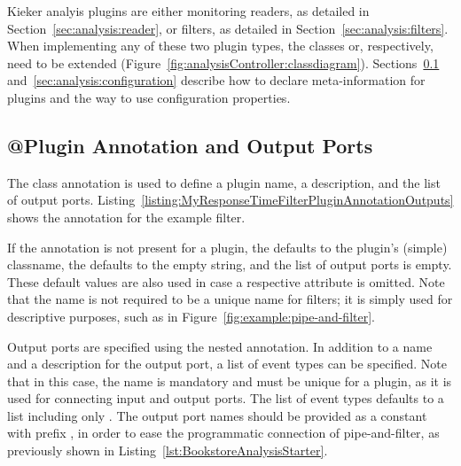 Kieker analyis plugins are either monitoring readers, as detailed in Section~\ref{sec:analysis:reader}, %
or filters, as detailed in Section~\ref{sec:analysis:filters}. When implementing %
any of these two plugin types, the classes  or, %
respectively,  need to be extended (Figure~\ref{fig:analysisController:classdiagram}). %
Sections~\ref{sec:analysis:pluginAnnotation} and~\ref{sec:analysis:configuration} %
describe how to declare meta-information for plugins and the way to use %
configuration properties. 


\subsection{@Plugin Annotation and Output Ports}\label{sec:analysis:pluginAnnotation}

\noindent The  class annotation is used to define a %
plugin name, a description, and the list of output ports. %
Listing~\ref{listing:MyResponseTimeFilterPluginAnnotationOutputs} shows the %
 annotation for the example filter.

If the  annotation is not present for a plugin, the  %
defaults to the plugin's (simple) classname, the  defaults %
to the empty string, and the list of output ports is empty. These default values %
are also used in case a respective attribute is omitted. %
Note that the name is not required to be a unique name for filters; it is simply %
used for descriptive purposes, such as in Figure~\ref{fig:example:pipe-and-filter}. %

Output ports are specified using the nested  annotation. %
In addition to a name and a description for the output port, a list of event %
types can be specified. Note that in this case, the name is mandatory and must %
be unique for a plugin, as it is used for connecting input and output ports. %
The list of event types defaults to a list including only . %
The output port names should be provided as a  constant %
with prefix , in order to ease the programmatic connection of %
pipe-and-filter, as previously shown in Listing~\ref{lst:BookstoreAnalysisStarter}.

